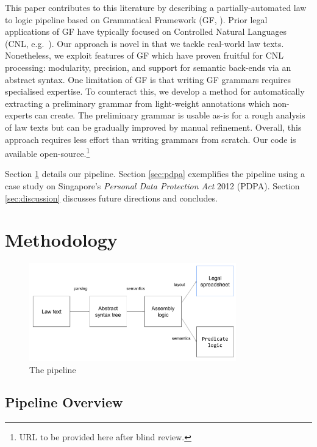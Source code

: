 \documentclass{IOS-Book-Article}
\begin{document}
This paper contributes to this literature by describing a partially-automated law to logic pipeline based on Grammatical Framework (GF, \cite{ranta-2011}). Prior legal applications of GF \cite{angelov-al-2013, gdpr-2018} have typically focused on Controlled Natural Languages (CNL, e.g.\ \cite{fuchs-al-2008, angelov-ranta-2009}).
Our approach is novel in that we tackle real-world law texts. Nonetheless, we exploit features of GF which have proven fruitful for CNL processing: modularity, precision, and support for semantic back-ends via an abstract syntax. One limitation of GF is that writing GF grammars requires specialised expertise. To counteract this, we develop a method for automatically extracting a preliminary grammar from light-weight annotations which non-experts can create. The preliminary grammar is usable as-is for a rough analysis of law texts but can be gradually improved by manual refinement. Overall, this approach requires less effort than writing grammars from scratch. Our code is available open-source.\footnote{URL to be provided here after blind review.}

Section \ref{sec:methods} details our pipeline. Section \ref{sec:pdpa} exemplifies the pipeline using a case study on Singapore's \textit{Personal Data Protection Act} 2012 (PDPA). Section \ref{sec:discussion} discusses future directions and concludes.

\section{Methodology}
\label{sec:methods}

\begin{figure}[h!]
    \includegraphics[width=0.8\textwidth]{pipeline.png}
\caption{The pipeline}
\label{pipeline}
\end{figure}

\subsection{Pipeline Overview}
\end{document}
